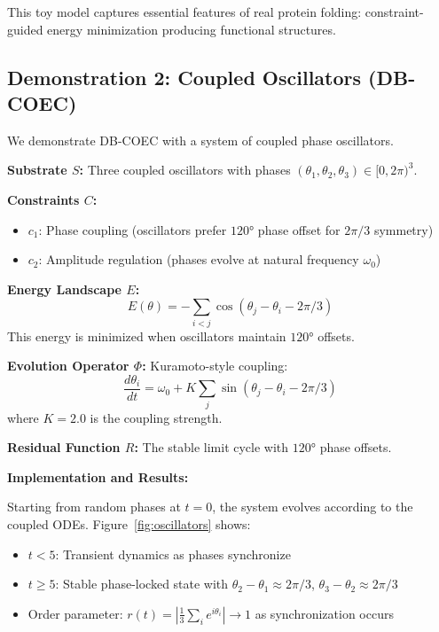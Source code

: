 \documentclass[11pt]{article}
\begin{document}
This toy model captures essential features of real protein folding: constraint-guided energy minimization producing functional structures.

\subsection{Demonstration 2: Coupled Oscillators (DB-COEC)}

We demonstrate DB-COEC with a system of coupled phase oscillators.

\textbf{Substrate $S$:} Three coupled oscillators with phases $(\theta_1, \theta_2, \theta_3) \in [0, 2\pi)^3$.

\textbf{Constraints $C$:}
\begin{itemize}
\item $c_1$: Phase coupling (oscillators prefer $120°$ phase offset for $2\pi/3$ symmetry)
\item $c_2$: Amplitude regulation (phases evolve at natural frequency $\omega_0$)
\end{itemize}

\textbf{Energy Landscape $E$:}
\begin{equation}
E(\theta) = -\sum_{i<j} \cos(\theta_j - \theta_i - 2\pi/3)
\end{equation}
This energy is minimized when oscillators maintain $120°$ offsets.

\textbf{Evolution Operator $\Phi$:} Kuramoto-style coupling:
\begin{equation}
\frac{d\theta_i}{dt} = \omega_0 + K\sum_{j} \sin(\theta_j - \theta_i - 2\pi/3)
\end{equation}
where $K = 2.0$ is the coupling strength.

\textbf{Residual Function $R$:} The stable limit cycle with $120°$ phase offsets.

\textbf{Implementation and Results:}

Starting from random phases at $t=0$, the system evolves according to the coupled ODEs. Figure~\ref{fig:oscillators} shows:

\begin{itemize}
\item $t < 5$: Transient dynamics as phases synchronize
\item $t \geq 5$: Stable phase-locked state with $\theta_2 - \theta_1 \approx 2\pi/3$, $\theta_3 - \theta_2 \approx 2\pi/3$
\item Order parameter: $r(t) = |\frac{1}{3}\sum_i e^{i\theta_i}| \to 1$ as synchronization occurs
\end{itemize}
\end{document}
